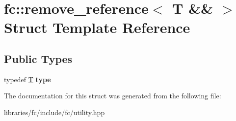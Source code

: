 \hypertarget{structfc_1_1remove__reference_3_01_t_01_6_6_01_4}{}\section{fc\+:\+:remove\+\_\+reference$<$ T \&\& $>$ Struct Template Reference}
\label{structfc_1_1remove__reference_3_01_t_01_6_6_01_4}
\subsection*{Public Types}
\begin{DoxyCompactItemize}
\item 
\mbox{\label{structfc_1_1remove__reference_3_01_t_01_6_6_01_4_af3611c358679728d4272abe5a526d738}} 
typedef \mbox{\hyperlink{struct_t}{T}} {\bfseries type}
\end{DoxyCompactItemize}


The documentation for this struct was generated from the following file\+:\begin{DoxyCompactItemize}
\item 
libraries/fc/include/fc/utility.\+hpp\end{DoxyCompactItemize}
